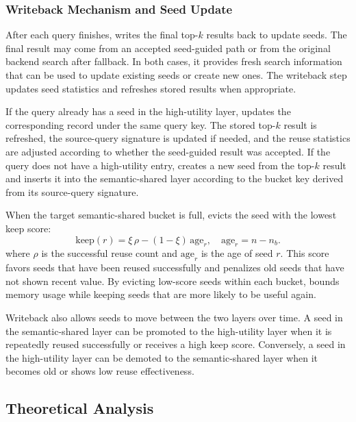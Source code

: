 \subsubsection{Writeback Mechanism and Seed Update}

After each query finishes, \system writes the final top-$k$ results back to update seeds. 
The final result may come from an accepted seed-guided path or from the original backend search after fallback.
In both cases, it provides fresh search information that can be used to update existing seeds or create new ones.
The writeback step updates seed statistics and refreshes stored results when appropriate.

If the query already has a seed in the high-utility layer, \system updates the corresponding record under the same query key.
The stored top-$k$ result is refreshed, the source-query signature is updated if needed, and the reuse statistics are adjusted according to whether the seed-guided result was accepted.
If the query does not have a high-utility entry, \system creates a new seed from the top-$k$ result and inserts it into the semantic-shared layer according to the bucket key derived from its source-query signature.

When the target semantic-shared bucket is full, \system evicts the seed with the lowest keep score:
\begin{equation}
\mathrm{keep}(r)=\xi\,\rho-(1-\xi)\,\mathrm{age}_r, \quad \mathrm{age}_r=n-n_b.
\end{equation}
where $\rho$ is the successful reuse count and $\mathrm{age}_r$ is the age of seed $r$.
This score favors seeds that have been reused successfully and penalizes old seeds that have not shown recent value.
By evicting low-score seeds within each bucket, \system bounds memory usage while keeping seeds that are more likely to be useful again.

Writeback also allows seeds to move between the two layers over time.
A seed in the semantic-shared layer can be promoted to the high-utility layer when it is repeatedly reused successfully or receives a high keep score.
Conversely, a seed in the high-utility layer can be demoted to the semantic-shared layer when it becomes old or shows low reuse effectiveness.


\subsection{Theoretical Analysis}
\label{subsec:briskseed-complexity}

